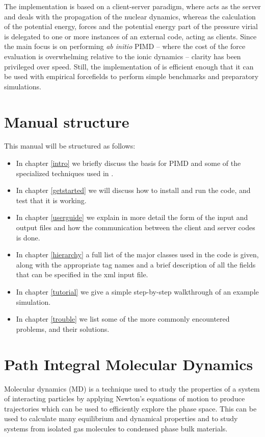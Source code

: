 \documentclass[11pt,english,fleqn]{report}
\begin{document}
The implementation is based on a client-server paradigm, where \ipi
acts as the server and deals with the propagation of the nuclear dynamics,
whereas the calculation of the potential energy, forces and the potential
energy part of the pressure virial is delegated to one or more instances
of an external code, acting as clients. Since the main focus is on
performing \emph{ab initio} PIMD -- where the cost of the force evaluation
is overwhelming relative to the ionic dynamics -- clarity has been
privileged over speed. Still, the implementation of \ipi is efficient
enough that it can be used with empirical forcefields to perform simple
benchmarks and preparatory simulations. 


\section{Manual structure}

This manual will be structured as follows: 
\begin{itemize}
\item In chapter \ref{intro} we briefly discuss the basis for PIMD and
some of the specialized techniques used in \ipi. 
\item In chapter \ref{getstarted} we will discuss how to install 
and run the code, and test that it is working.
\item In chapter \ref{userguide} we explain in more detail the form of the input
and output files and how the communication between the client and
server codes is done.
\item In chapter \ref{hierarchy} a full list of the major classes used
in the code is given, along with the appropriate tag names and a brief
description of all the fields that can be specified in the xml input
file.
\item In chapter \ref{tutorial} we give a simple step-by-step walkthrough of
an example \ipi simulation.
\item In chapter \ref{trouble} we list some of the more commonly encountered
problems, and their solutions.
\end{itemize}

\section{Path Integral Molecular Dynamics}

Molecular dynamics (MD) is a technique used to study the properties
of a system of interacting particles by applying Newton's equations
of motion to produce trajectories which can be used to efficiently
explore the phase space. This can be used to calculate many equilibrium
and dynamical properties and to study systems from isolated gas molecules
to condensed phase bulk materials.
\end{document}
